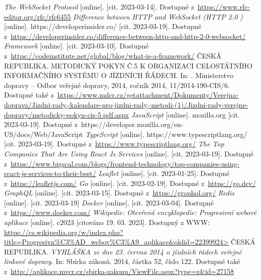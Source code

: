 \begin{thebibliography}{99}
     \textit{The WebSocket Protocol} [online]. [cit. 2023-03-14]. Dostupné z~\url{https://www.rfc-editor.org/rfc/rfc6455}
     \textit{Difference between HTTP and WebSocket (HTTP 2.0 )} [online]. https://developerinsider.co/ [cit. 2023-03-19]. Dostupné z~\url{https://developerinsider.co/difference-between-http-and-http-2-0-websocket/}
     \textit{Framework} [online]. [cit. 2023-03-10]. Dostupné z~\url{https://codeinstitute.net/global/blog/what-is-a-framework/}
     ČESKÁ REPUBLIKA. METODICKÝ POKYN Č.5 K ORGANIZACI CELOSTÁTNÍHO INFORMAČNÍHO SYSTÉMU O JÍZDNÍCH ŘÁDECH. In: . Ministerstvo dopravy – Odbor veřejné dopravy, 2014, ročník 2014, 11/2014-190-CIS/6. Dostupné také z~\url{https://www.mdcr.cz/getattachment/Dokumenty/Verejna-doprava/Jizdni-rady,-kalendare-pro-jizdni-rady,-metodi-(1)/Jizdni-rady-verejne-dopravy/metodicky-pokyn-cis-5.pdf.aspx}
     \textit{JavaScript} [online]. mozilla.org [cit. 2023-03-19]. Dostupné z~{https://developer.mozilla.org/en-US/docs/Web/JavaScript}
     \textit{TypeScript} [online]. https://www.typescriptlang.org/ [cit. 2023-03-19]. Dostupné z~\url{https://www.typescriptlang.org/}
     \textit{The Top Companies That Are Using React Js Services} [online]. [cit. 2023-03-19]. Dostupné z~\url{https://www.bigscal.com/blogs/frontend-technology/top-companies-using-react-js-services-to-their-best/}
     \textit{Leaflet} [online]. [cit. 2023-01-25]. Dostupné z~\url{https://leafletjs.com/}
     \textit{Go} [online]. [cit. 2023-02-19]. Dostupné z~\url{https://go.dev/}
     \textit{GraphQL} [online]. [cit. 2023-03-15]. Dostupné z~\url{https://graphql.org/}
     \textit{Redis} [online]. [cit. 2023-03-19]
     \textit{Docker} [online]. [cit. 2023-03-04]. Dostupné z~\url{https://www.docker.com/}
     \textit{Wikipedie: Otevřená encyklopedie: Progresivní webové aplikace} [online]. c2023 [citováno 19. 03. 2023]. Dostupný z WWW: \url{https://cs.wikipedia.org/w/index.php?title=Progresivn%C3%AD_webov%C3%A9_aplikace&oldid=22399924>}
     ČESKÁ REPUBLIKA. \textit{VYHLÁŠKA ze dne 23. června 2014 o jízdních řádech veřejné linkové dopravy.} In: Sbírka zákonů. 2014, částka 52, číslo 122. Dostupné také z~\url{http://aplikace.mvcr.cz/sbirka-zakonu/ViewFile.aspx?type=z&id=27158}


\end{thebibliography}
